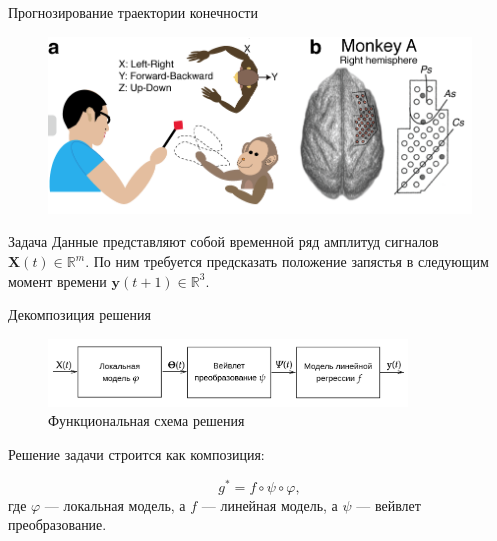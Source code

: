 \documentclass[9pt,pdf,hyperref={unicode}]{beamer}
\renewcommand{\phi}{\varphi}
\begin{document}
\begin{frame}{Прогнозирование траектории конечности}
\begin{figure}
	\includegraphics[width=0.7\linewidth]{figs/task.png}
\end{figure}
\begin{block}{Задача}
Данные  представляют собой временной ряд амплитуд сигналов $\mathbf{X}(t)  \in \mathbb{R}^{m}$. По ним требуется предсказать положение запястья в следующим момент времени $\mathbf{y}(t+1) \in \mathbb{R}^3$.
\end{block}
\end{frame}
\begin{frame}{Декомпозиция решения}
\begin{figure}
	\includegraphics[width=0.85\textwidth]{figs/algo.pdf}
	\caption{Функциональная схема решения}
\end{figure}
\begin{block}

Решение задачи строится как композиция:

\[
g^* =  f \circ \psi \circ \phi,
\]
где $\phi$ --- локальная модель, а $f$ --- линейная модель, а $\psi$ --- вейвлет преобразование.
\end{block}
\end{frame}
\end{document}

